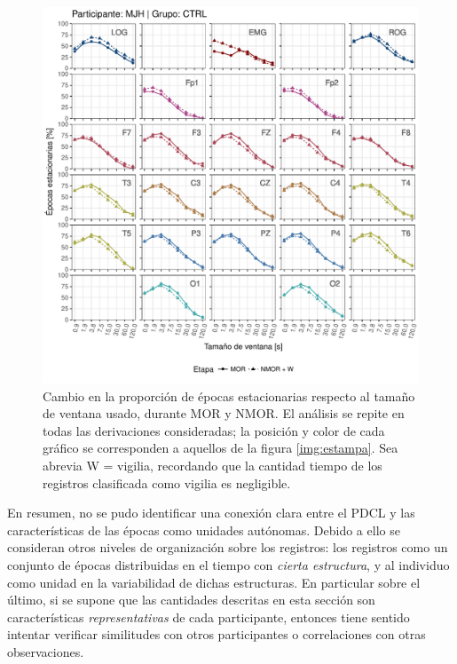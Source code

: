 \documentclass[12pt,letterpaper]{book}
\begin{document}
\begin{figure}
\centering
\includegraphics[width=\linewidth]{./scripts_graf_res/MJNNVIGILOS_cabeza_epocas_v2.pdf}
\caption{Cambio en la proporción de épocas estacionarias respecto al tamaño de ventana usado, durante MOR y NMOR. El análisis se repite en todas las derivaciones consideradas; la posición y color de cada gráfico se corresponden a aquellos de la figura \ref{img:estampa}. Sea abrevia W = vigilia, recordando que la cantidad tiempo de los registros clasificada como vigilia es negligible.}
\label{cabeza_repoio}
\end{figure}

En resumen, no se pudo identificar una conexión clara entre el PDCL y las características de las épocas como unidades autónomas.
%
Debido a ello se consideran otros niveles de organización sobre los registros: los registros como un conjunto de épocas distribuidas en el tiempo con \textit{cierta estructura}, y al individuo como unidad en la variabilidad de dichas estructuras.
%
En particular sobre el último, si se supone que las cantidades descritas en esta sección son características \textit{representativas} de cada participante, entonces tiene sentido intentar verificar similitudes con otros participantes o correlaciones con otras observaciones.

\end{document}
